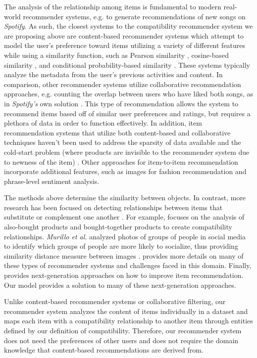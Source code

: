 The analysis of the relationship among items is fundamental to modern real-world recommender systems, e.g. to generate recommendations of new songs on \textit{Spotify}. As such, the closest systems to the compatibility recommender system we are proposing above are content-based recommender systems \cite{lew-sebe-djeraba-jain,adomavicius-tuzhilin} which attempt to model the user's preference toward items utilizing a variety of different features while using a similarity function, such as Pearson similarity \cite{melville}, cosine-based similarity \cite{deshpande}, and conditional probability-based similarity \cite{karypis}. These systems typically analyze the metadata from the user's previous activities and content. In comparison, other recommender systems utilize collaborative recommendation approaches, e.g. counting the overlap between users who have liked both songs, as in \textit{Spotify's} own solution \cite{madathil}. This type of recommendation allows the system to recommend items based off of similar user preferences and ratings, but requires a plethora of data in order to function effectively. In addition, item recommendation systems that utilize both content-based and collaborative techniques haven't been used to address the sparsity of data available and the cold-start problem (where products are invisible to the recommender system due to newness of the item) \cite{adomavicius-tuzhilin}. Other approaches for item-to-item recommendation incorporate additional features, such as images for fashion recommendation and phrase-level sentiment analysis.

The methods above determine the similarity between objects. In contrast, more research has been focused on detecting relationships between items that substitute or complement one another \cite{li-liu-huag}. For example, \cite{yin} focuses on the analysis of also-bought products and bought-together products to create compatibility relationships. \textit{Murillo et al.} analyzed photos of groups of people in social media to identify which groups of people are more likely to socialize, thus providing similarity distance measure between images \cite{urban-tribes}. \cite{ricci} provides more details on many of these types of recommender systems and challenges faced in this domain. Finally, \cite{adomavicius-tuzhilin} provides next-generation approaches on how to improve item recommendation. Our model provides a solution to many of these next-generation approaches. 

Unlike content-based recommender systems or collaborative filtering, our recommender system analyzes the content of items individually in a dataset and maps each item with a compatibility relationship to another item through entities defined by our definition of compatibility. Therefore, our recommender system does not need the preferences of other users and does not require the domain knowledge that content-based recommendations are derived from.

